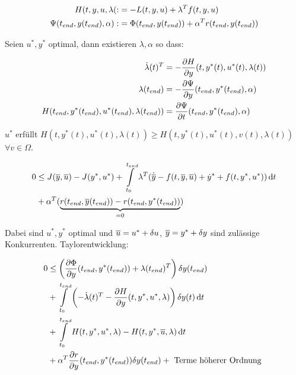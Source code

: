 \begin{align*}
H(t,y,u,\lambda( :&= -L(t,y,u)+\lambda^T f(t,y,u) \\
\Psi({t_{end}}, y({t_{end}}), \alpha) :&= \Phi({t_{end}}, y({t_{end}})) + \alpha^T r({t_{end}}, y({t_{end}})) \\
\end{align*}

Seien $u^*, y^*$ optimal, dann existieren $\lambda, \alpha$ so dass:

\begin{align*}
\dot \lambda(t)^T &= -\frac{\partial H}{\partial y} (t,y^*(t), u^*(t), \lambda(t)) \\
\lambda({t_{end}}) &= - \frac{\partial \Psi}{\partial y} ({t_{end}}, y^*({t_{end}}), \alpha) \\
H({t_{end}}, y^*({t_{end}}), u^*({t_{end}}), \lambda({t_{end}})) &= \frac{\partial \Psi}{\partial t} ({t_{end}}, y^*({t_{end}}), \alpha) \\
\end{align*}

$u^*$ erfüllt $H(t,y^*(t), u^*(t), \lambda(t)) \geq H(t, y^*(t), u^*(t), v(t), \lambda(t))$ $\forall v \in \Omega$.


\begin{align*}
0 & \leq J(\overline y, \overline u) - J(y^*, u^*) + \int\limits_{t_0}^{t_{end}} \lambda^T(\dot{\overline y} - f(t,\overline y,\overline u)+ \dot y^* + f(t,y^*, u^*)) \,\mathrm d t \\
&+ \alpha^T (\underbrace{r({t_{end}}, \overline y({t_{end}})) - r({t_{end}}, y^*({t_{end}}))}_{=0}) \\
\end{align*}

Dabei sind $u^*, y^*$ optimal und $\overline u = u^* + \delta u$, $\overline y = y^* + \delta y$ sind zulässige Konkurrenten.
Taylorentwicklung:

\begin{align*}
0 & \leq \left( \frac{\partial \Phi}{\partial y} ({t_{end}}, y^*({t_{end}})) + \lambda({t_{end}})^T \right) \delta y({t_{end}}) \\
&+ \int\limits_{t_0}^{t_{end}} \left( -\dot \lambda(t)^T - \frac{\partial H}{\partial y} (t,y^*,u^*,\lambda)\right) \delta y(t) \,\mathrm d t \\
& + \int\limits_{t_0}^{t_{end}} H(t,y^*,u^*,\lambda) - H(t, y^*, \overline u, \lambda) \,\mathrm d t\\
&+ \alpha^T \frac{\partial r}{\partial y} ({t_{end}}, y^*({t_{end}})) \delta y({t_{end}}) + \text{ Terme höherer Ordnung } 
\end{align*}

